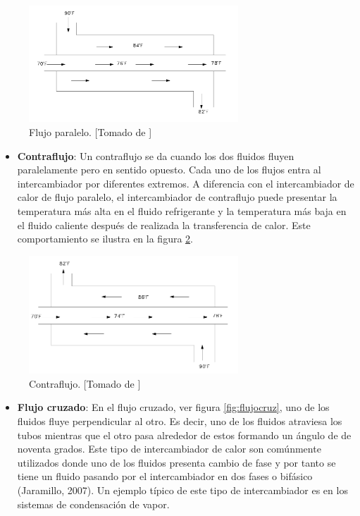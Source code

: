 \documentclass[12pt,letterpaper]{article}     %
\begin{document}
\begin{figure}[H]
\centering
\includegraphics[width=0.7\textwidth]{paralelo.PNG}
\caption{Flujo paralelo. [Tomado de \cite{Jaramillo}]}
\label{fig:paralelo}
\end{figure}

\begin{itemize}
\item \textbf{Contraflujo}: Un contraflujo se da cuando los dos fluidos fluyen paralelamente pero en sentido opuesto. Cada uno de los flujos entra al intercambiador por diferentes extremos. A diferencia con el intercambiador de calor de flujo paralelo, el intercambiador de contraflujo puede presentar la temperatura más alta en el fluido refrigerante y la temperatura más baja en el fluido caliente después de realizada la transferencia de calor. Este comportamiento se ilustra en la figura \ref{fig:contraflujo}.
\end{itemize}

\begin{figure}[H]
\centering
\includegraphics[width=0.7\textwidth]{contraflujo.png}
\caption{Contraflujo. [Tomado de \cite{Jaramillo}]}
\label{fig:contraflujo}
\end{figure}

\begin{itemize}
\item \textbf{Flujo cruzado}: En el flujo cruzado, ver figura \ref{fig:flujocruz}, uno de los fluidos fluye perpendicular al otro. Es decir, uno de los fluidos atraviesa los tubos mientras que el otro pasa alrededor de estos formando un ángulo de de noventa grados. Este tipo de intercambiador de calor son comúnmente utilizados donde uno de los fluidos presenta cambio de fase y por tanto se tiene un fluido pasando por el intercambiador en dos fases o bifásico (Jaramillo, 2007). Un ejemplo típico de este tipo de intercambiador es en los sistemas de condensación de vapor.
\end{itemize}
\end{document}
